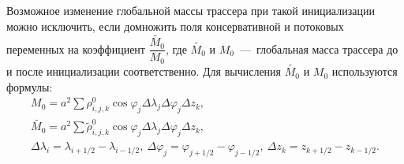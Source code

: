 \documentclass[14pt, a4paper]{extarticle}
\begin{document}
Возможное изменение глобальной массы трассера при такой инициализации можно исключить, если домножить поля консервативной и потоковых переменных на коэффициент  $\dfrac{\tilde{M_0}}{M_0}$, где $\tilde{M_0}$ и $M_0$~---~глобальная масса трассера до и после инициализации соответственно. Для вычисления $\tilde{M_0}$ и $M_0$ используются формулы:
\begin{gather}
M_0 = a^2\displaystyle\sum \rho_{i, j, k}^0 \cos\varphi_j \Delta \lambda_j \Delta \varphi_j \Delta z_k,\nonumber\\
\tilde{M_0} = a^2\displaystyle\sum \tilde{\rho}_{i, j, k}^0 \cos\varphi_j \Delta \lambda_j \Delta \varphi_j \Delta z_k,\nonumber\\
\Delta \lambda_i = \lambda_{i+1/2}-\lambda_{i-1/2}, \ \Delta \varphi_j = \varphi_{j+1/2}-\varphi_{j-1/2}, \ \Delta z_k = z_{k+1/2} - z_{k-1/2}. \nonumber
\end{gather}
\end{document}
